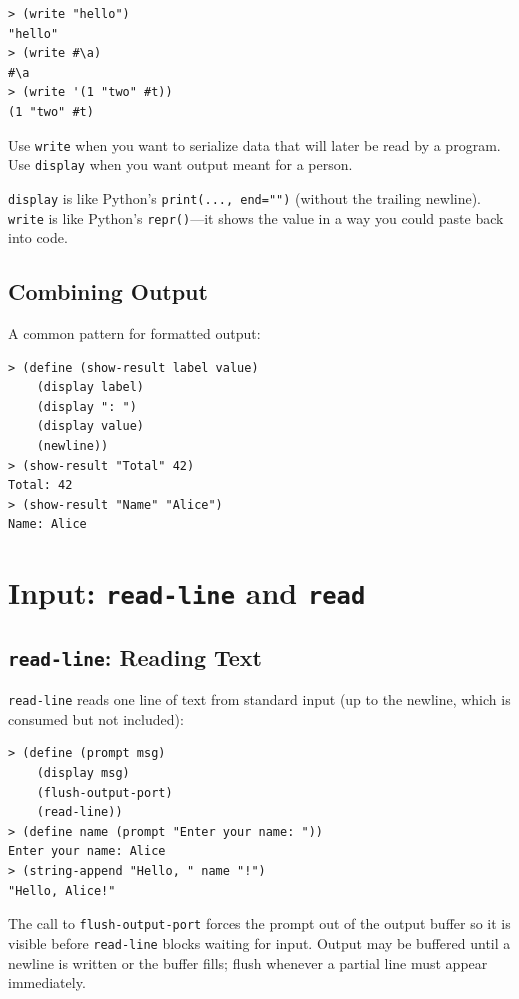 \begin{lstlisting}[style=repl]
> (write "hello")
"hello"
> (write #\a)
#\a
> (write '(1 "two" #t))
(1 "two" #t)
\end{lstlisting}

Use \texttt{write} when you want to serialize data that will later be read by a program. Use \texttt{display} when you want output meant for a person.

\begin{note}
\texttt{display} is like Python's \texttt{print(..., end="")} (without the trailing newline). \texttt{write} is like Python's \texttt{repr()}---it shows the value in a way you could paste back into code.
\end{note}

\subsection{Combining Output}

A common pattern for formatted output:

\begin{lstlisting}[style=repl]
> (define (show-result label value)
    (display label)
    (display ": ")
    (display value)
    (newline))
> (show-result "Total" 42)
Total: 42
> (show-result "Name" "Alice")
Name: Alice
\end{lstlisting}

\section{Input: \texttt{read-line} and \texttt{read}}

\subsection{\texttt{read-line}: Reading Text}

\texttt{read-line} reads one line of text from standard input (up to the newline, which is consumed but not included):

\begin{lstlisting}[style=repl]
> (define (prompt msg)
    (display msg)
    (flush-output-port)
    (read-line))
> (define name (prompt "Enter your name: "))
Enter your name: Alice
> (string-append "Hello, " name "!")
"Hello, Alice!"
\end{lstlisting}

The call to \texttt{flush-output-port} forces the prompt out of the output buffer so it is visible before \texttt{read-line} blocks waiting for input. Output may be buffered until a newline is written or the buffer fills; flush whenever a partial line must appear immediately.

